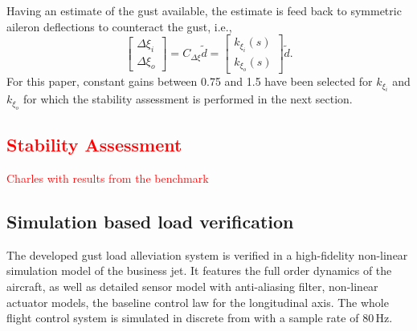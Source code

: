 \documentclass[graybox]{svmult}
\begin{document}
Having an estimate of the gust available, the estimate is feed back to symmetric aileron deflections to counteract the gust, i.e., 
\begin{equation}	
	\begin{bmatrix}
		\Delta \xi_i \\ \Delta \xi_o 
	\end{bmatrix} = 
 	C_{\Delta\xi}
	\tilde d 
	=
	\begin{bmatrix}
		k_{\xi_i}(s) \\ k_{\xi_o}(s) 
	\end{bmatrix}
	\tilde d.
\end{equation}
For this paper, constant gains between 0.75 and 1.5 have been selected for $k_{\xi_i}$ and $k_{\xi_o}$ for which the stability assessment is performed in the next section.




\textcolor{red}{
\subsection{Stability Assessment}\label{APPsubsec:stab}
Charles with results from the benchmark
}

\subsection{Simulation based load verification}\label{APPsubsec:sim}
The developed gust load alleviation system is verified in a high-fidelity non-linear simulation model of the business jet. It features the full order dynamics of the aircraft, as well as detailed sensor model with anti-aliasing filter, non-linear actuator models, the baseline control law for the longitudinal axis. The whole flight control system is simulated in discrete from with a sample rate of 80\,Hz.
\end{document}

